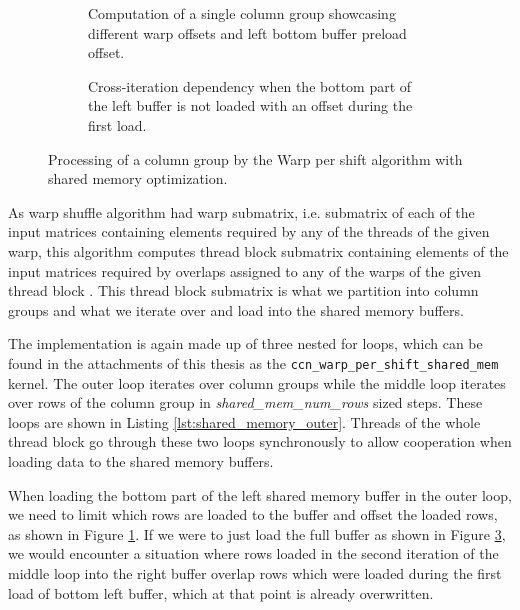 \begin{figure}[ht]
	\centering	
	\begin{subfigure}{\textwidth}
		\centering
		\def\svgwidth{0.66\textwidth}
		\fontsize{8}{10}\selectfont
		
		\caption{Computation of a single column group showcasing different warp offsets and left bottom buffer preload offset.}
		\label{fig:shared_mem_buffer_iterations}
	\end{subfigure}

	\begin{subfigure}{\textwidth}
		\centering
		\def\svgwidth{0.66\textwidth}
		\fontsize{8}{10}\selectfont
		
		\caption{Cross-iteration dependency when the bottom part of the left buffer is not loaded with an offset during the first load.}
		\label{fig:left_buffer_no_preload}
	\end{subfigure}
	
	\caption{Processing of a column group by the Warp per shift algorithm with shared memory optimization.}
\end{figure}

As warp shuffle algorithm had warp submatrix, i.e. submatrix of each of the input matrices containing elements required by any of the threads of the given warp, this algorithm computes thread block submatrix containing elements of the input matrices required by overlaps assigned to any of the warps of the given thread block . This thread block submatrix is what we partition into column groups and what we iterate over and load into the shared memory buffers.

The implementation is again made up of three nested for loops, which can be found in the attachments of this thesis as the \texttt{ccn\_warp\_per\_shift\_shared\_mem} kernel. The outer loop iterates over column groups while the middle loop iterates over rows of the column group in \textit{shared\_mem\_num\_rows} sized steps. These loops are shown in Listing \ref{lst:shared_memory_outer}. Threads of the whole thread block go through these two loops synchronously to allow cooperation when loading data to the shared memory buffers. 

When loading the bottom part of the left shared memory buffer in the outer loop, we need to limit which rows are loaded to the buffer and offset the loaded rows, as shown in Figure \ref{fig:shared_mem_buffer_iterations}. If we were to just load the full buffer as shown in Figure \ref{fig:left_buffer_no_preload}, we would encounter a situation where rows loaded in the second iteration of the middle loop into the right buffer overlap rows which were loaded during the first load of bottom left buffer, which at that point is already overwritten.  

